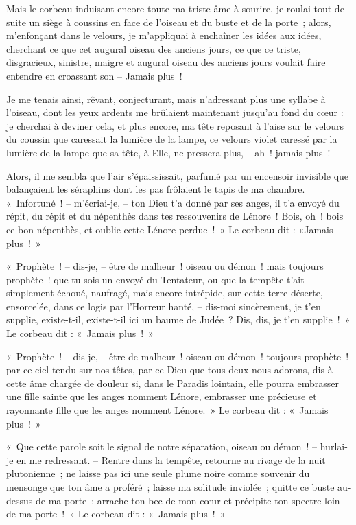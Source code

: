 \documentclass[openany]{book} %
\begin{document}
\bigskip
Mais le corbeau induisant encore toute ma triste âme à sourire, je roulai tout de suite un siège à coussins en face de l’oiseau et du buste et de la porte~; alors, m’enfonçant dans le velours, je m’appliquai à enchaîner les idées aux idées, cherchant ce que cet augural oiseau des anciens jours, ce que ce triste, disgracieux, sinistre, maigre et augural oiseau des anciens jours voulait faire entendre en croassant son – Jamais plus~!

\bigskip
Je me tenais ainsi, rêvant, conjecturant, mais n’adressant plus une syllabe à l’oiseau, dont les yeux ardents me brûlaient maintenant jusqu’au fond du cœur : je cherchai à deviner cela, et plus encore, ma tête reposant à l’aise sur le velours du coussin que caressait la lumière de la lampe, ce velours violet caressé par la lumière de la lampe que sa tête, à Elle, ne pressera plus, – ah~! jamais plus~!

\bigskip
Alors, il me sembla que l’air s’épaississait, parfumé par un encensoir invisible que balançaient les séraphins dont les pas frôlaient le tapis de ma chambre. «~Infortuné~! – m’écriai-je, – ton Dieu t’a donné par ses anges, il t’a envoyé du répit, du répit et du népenthès dans tes ressouvenirs de Lénore~! Bois, oh~! bois ce bon népenthès, et oublie cette Lénore perdue~!~» Le corbeau dit : «Jamais plus~!~»

\bigskip
«~Prophète~! – dis-je, – être de malheur~! oiseau ou démon~! mais toujours prophète~! que tu sois un envoyé du Tentateur, ou que la tempête t’ait simplement échoué, naufragé, mais encore intrépide, sur cette terre déserte, ensorcelée, dans ce logis par l’Horreur hanté, – dis-moi sincèrement, je t’en supplie, existe-t-il, existe-t-il ici un baume de Judée~? Dis, dis, je t’en supplie~!~» Le corbeau dit : «~Jamais plus~!~»

\bigskip
«~Prophète~! – dis-je, – être de malheur~! oiseau ou démon~! toujours prophète~! par ce ciel tendu sur nos têtes, par ce Dieu que tous deux nous adorons, dis à cette âme chargée de douleur si, dans le Paradis lointain, elle pourra embrasser une fille sainte que les anges nomment Lénore, embrasser une précieuse et rayonnante fille que les anges nomment Lénore.~» Le corbeau dit : «~Jamais plus~!~»

\bigskip
«~Que cette parole soit le signal de notre séparation, oiseau ou démon~! – hurlai-je en me redressant. – Rentre dans la tempête, retourne au rivage de la nuit plutonienne~; ne laisse pas ici une seule plume noire comme souvenir du mensonge que ton âme a proféré~; laisse ma solitude inviolée~; quitte ce buste au-dessus de ma porte~; arrache ton bec de mon cœur et précipite ton spectre loin de ma porte~!~» Le corbeau dit : «~Jamais plus~!~»
\end{document}
